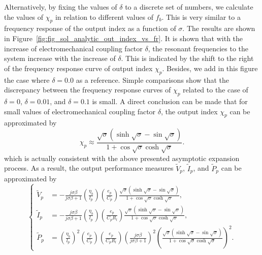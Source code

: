 \documentclass{article}
\begin{document}
Alternatively, by fixing the values of $\delta$ to a discrete set of numbers, we calculate the values of $\chi_p$ in relation to different values of $f_b$. This is very similar to a frequency response of the output index as a function of $\sigma$. The results are shown in Figure~\ref{fig:fig_sol_analytic_out_index_vs_fr}. It is shown that with the increase of electromechanical coupling factor $\delta$, the resonant frequencies to the system increase with the increase of $\delta$. This is indicated by the shift to the right of the frequency response curve of output index $\chi_p$. Besides, we add in this figure the case where $\delta = 0.0$ as a reference. Simple comparisons show that the discrepancy between the frequency response curves of $\chi_p$ related to the case of $\delta = 0$, $\delta=0.01$, and $\delta = 0.1$ is small. A direct conclusion can be made that for small values of electromechanical coupling factor $\delta$, the output index $\chi_p$ can be approximated by 
\begin{equation}
    \chi_p \approx \frac{ \sqrt{\sigma} \left( \sinh\sqrt{\sigma} - \sin\sqrt{\sigma} \right) }{ 1 + \cos\sqrt{\sigma } \cosh\sqrt{\sigma } }.
\end{equation}
which is actually consistent with the above presented asymptotic expansion process. As a result, the output performance measures $\tilde{V}_p$, $\tilde{I}_p$, and $\tilde{P}_p$ can be approximated by 
\begin{equation}
    \left\{\begin{aligned}
        \tilde{V}_p &= - \frac{j \sigma \beta}{j \sigma \beta + 1} \left(\frac{\eta_b}{l_p}\right) \left(\frac{e_p}{C_p}\right) \frac{ \sqrt{\sigma} \left( \sinh\sqrt{\sigma} - \sin\sqrt{\sigma} \right) }{ 1 + \cos\sqrt{\sigma } \cosh\sqrt{\sigma } } , \\
        \tilde{I}_p &= - \frac{ j \sigma \beta } {j \sigma \beta + 1} \left( \frac{\eta_b}{l_p} \right) \left( \frac{e_p}{C_p R_l} \right) \frac{ \sqrt{\sigma} \left( \sinh\sqrt{\sigma} - \sin\sqrt{\sigma} \right) }{ 1 + \cos\sqrt{\sigma } \cosh\sqrt{\sigma } }, \\
        \tilde{P}_p &= \left(\frac{\eta_b}{l_p}\right)^2 \left(\frac{e_p}{C_p}\right) \left( \frac{e_p}{C_p R_l} \right) \left( \frac{ j \sigma \beta}{ j \sigma \beta + 1 } \right)^2 \left( \frac{ \sqrt{\sigma} \left( \sinh\sqrt{\sigma} - \sin\sqrt{\sigma} \right) }{ 1 + \cos\sqrt{\sigma } \cosh\sqrt{\sigma } } \right)^2.
    \end{aligned}\right.
    \label{eq:eq_peh_perfs_compact_form_approx}
\end{equation}
\end{document}
